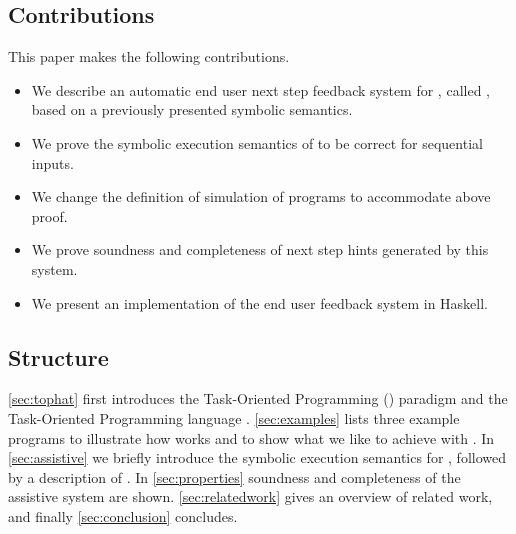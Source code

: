 \subsection{Contributions}

This paper makes the following contributions.

\begin{itemize}
  \item We describe an automatic end user next step feedback system for \TOPHAT, called \ASTOPHAT, based on a previously presented symbolic semantics.
  \item We prove the symbolic execution semantics of \TOPHAT to be correct for sequential inputs.
  \item We change the definition of simulation of \TOPHAT programs to accommodate above proof.
  \item We prove soundness and completeness of next step hints generated by this system.
  \item We present an implementation of the end user feedback system in Haskell.
\end{itemize}


\subsection{Structure}

\cref{sec:tophat} first introduces the Task-Oriented Programming (\TOP) paradigm and the Task-Oriented Programming language \TOPHAT.
\cref{sec:examples} lists three example programs to illustrate how \TOPHAT works and to show what we like to achieve with \ASTOPHAT.
In \cref{sec:assistive}  we briefly introduce the symbolic execution semantics for \TOPHAT,
followed by a description of \ASTOPHAT.
In \cref{sec:properties} soundness and completeness of the assistive system are shown.
\cref{sec:relatedwork} gives an overview of related work, and finally \cref{sec:conclusion} concludes.
